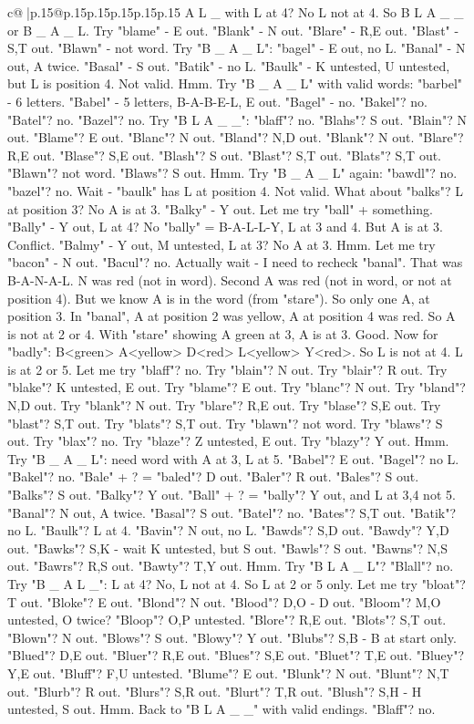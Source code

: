 \documentclass{article}
\begin{document}
{\begin{supertabular}{c@{$\;$}|p{.15\linewidth}@{}p{.15\linewidth}p{.15\linewidth}p{.15\linewidth}p{.15\linewidth}p{.15\linewidth}}
{{{A L \_ with L at 4? No L not at 4. So B L A \_ \_ or B \_ A \_ L. Try "blame" {-} E out. "Blank" {-} N out. "Blare" {-} R,E out. "Blast" {-} S,T out. "Blawn" {-} not word. Try "B \_ A \_ L": "bagel" {-} E out, no L. "Banal" {-} N out, A twice. "Basal" {-} S out. "Batik" {-} no L. "Baulk" {-} K untested, U untested, but L is position 4. Not valid. Hmm. Try "B \_ A \_ L" with valid words: "barbel" {-} 6 letters. "Babel" {-} 5 letters, B{-}A{-}B{-}E{-}L, E out. "Bagel" {-} no. "Bakel"? no. "Batel"? no. "Bazel"? no. Try "B L A \_ \_": "blaff"? no. "Blahs"? S out. "Blain"? N out. "Blame"? E out. "Blanc"? N out. "Bland"? N,D out. "Blank"? N out. "Blare"? R,E out. "Blase"? S,E out. "Blash"? S out. "Blast"? S,T out. "Blats"? S,T out. "Blawn"? not word. "Blaws"? S out. Hmm. Try "B \_ A \_ L" again: "bawdl"? no. "bazel"? no. Wait {-} "baulk" has L at position 4. Not valid. What about "balks"? L at position 3? No A is at 3. "Balky" {-} Y out. Let me try "ball" + something. "Bally" {-} Y out, L at 4? No "bally" = B{-}A{-}L{-}L{-}Y, L at 3 and 4. But A is at 3. Conflict. "Balmy" {-} Y out, M untested, L at 3? No A at 3. Hmm. Let me try "bacon" {-} N out. "Bacul"? no. Actually wait {-} I need to recheck "banal". That was B{-}A{-}N{-}A{-}L. N was red (not in word). Second A was red (not in word, or not at position 4). But we know A is in the word (from "stare"). So only one A, at position 3. In "banal", A at position 2 was yellow, A at position 4 was red. So A is not at 2 or 4. With "stare" showing A green at 3, A is at 3. Good. Now for "badly": B<green> A<yellow> D<red> L<yellow> Y<red>. So L is not at 4. L is at 2 or 5. Let me try "blaff"? no. Try "blain"? N out. Try "blair"? R out. Try "blake"? K untested, E out. Try "blame"? E out. Try "blanc"? N out. Try "bland"? N,D out. Try "blank"? N out. Try "blare"? R,E out. Try "blase"? S,E out. Try "blast"? S,T out. Try "blats"? S,T out. Try "blawn"? not word. Try "blaws"? S out. Try "blax"? no. Try "blaze"? Z untested, E out. Try "blazy"? Y out. Hmm. Try "B \_ A \_ L": need word with A at 3, L at 5. "Babel"? E out. "Bagel"? no L. "Bakel"? no. "Bale" + ? = "baled"? D out. "Baler"? R out. "Bales"? S out. "Balks"? S out. "Balky"? Y out. "Ball" + ? = "bally"? Y out, and L at 3,4 not 5. "Banal"? N out, A twice. "Basal"? S out. "Batel"? no. "Bates"? S,T out. "Batik"? no L. "Baulk"? L at 4. "Bavin"? N out, no L. "Bawds"? S,D out. "Bawdy"? Y,D out. "Bawks"? S,K {-} wait K untested, but S out. "Bawls"? S out. "Bawns"? N,S out. "Bawrs"? R,S out. "Bawty"? T,Y out. Hmm. Try "B L A \_ L"? "Blall"? no. Try "B \_ A L \_": L at 4? No, L not at 4. So L at 2 or 5 only. Let me try "bloat"? T out. "Bloke"? E out. "Blond"? N out. "Blood"? D,O {-} D out. "Bloom"? M,O untested, O twice? "Bloop"? O,P untested. "Blore"? R,E out. "Blots"? S,T out. "Blown"? N out. "Blows"? S out. "Blowy"? Y out. "Blubs"? S,B {-} B at start only. "Blued"? D,E out. "Bluer"? R,E out. "Blues"? S,E out. "Bluet"? T,E out. "Bluey"? Y,E out. "Bluff"? F,U untested. "Blume"? E out. "Blunk"? N out. "Blunt"? N,T out. "Blurb"? R out. "Blurs"? S,R out. "Blurt"? T,R out. "Blush"? S,H {-} H untested, S out. Hmm. Back to "B L A \_ \_" with valid endings. "Blaff"? no. }}}
\end{supertabular}}
\end{document}
